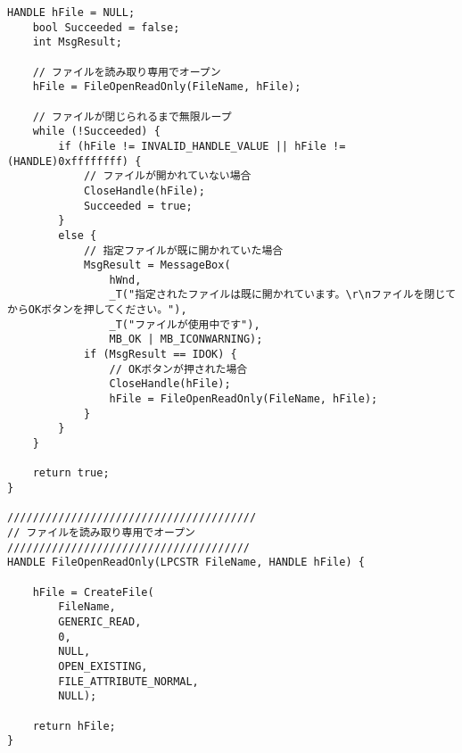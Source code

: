 \begin{lstlisting}[caption=file.cpp]
	HANDLE hFile = NULL;
	bool Succeeded = false;
	int MsgResult;

	// ファイルを読み取り専用でオープン
	hFile = FileOpenReadOnly(FileName, hFile);

	// ファイルが閉じられるまで無限ループ
	while (!Succeeded) {
		if (hFile != INVALID_HANDLE_VALUE || hFile != (HANDLE)0xffffffff) {
			// ファイルが開かれていない場合
			CloseHandle(hFile);
			Succeeded = true;
		}
		else {
			// 指定ファイルが既に開かれていた場合
			MsgResult = MessageBox(
				hWnd,
				_T("指定されたファイルは既に開かれています。\r\nファイルを閉じてからOKボタンを押してください。"),
				_T("ファイルが使用中です"),
				MB_OK | MB_ICONWARNING);
			if (MsgResult == IDOK) {
				// OKボタンが押された場合
				CloseHandle(hFile);
				hFile = FileOpenReadOnly(FileName, hFile);
			}
		}
	}

	return true;
}

///////////////////////////////////////
// ファイルを読み取り専用でオープン
//////////////////////////////////////
HANDLE FileOpenReadOnly(LPCSTR FileName, HANDLE hFile) {

	hFile = CreateFile(
		FileName,
		GENERIC_READ,
		0,
		NULL,
		OPEN_EXISTING,
		FILE_ATTRIBUTE_NORMAL,
		NULL);

	return hFile;
}
\end{lstlisting}

